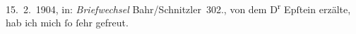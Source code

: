 \begin{ledgroupsized}[t]{13cm}
{{{                           15. 2. 1904, in: \emph{Briefwechsel}
                        Bahr/Schnitzler 302.}}}\label{K_L01392_2h}, von dem D\textsuperscript{r}{ }Epſtein erzälte, hab ich mich ſo ſehr
                  gefreut.\pend
           \endnumbering{}\end{ledgroupsized}  \newcommand{\dateiname}{L01392}\newcommand{\titel}{Hermann Bahr an Arthur Schnitzler, 23. 4. [1904]}\newcommand{\editorInnen}{ Kurt Ifkovits,  Martin Anton Müller}
            \footnotesize
\begin{ledgroupsized}[t]{11.5cm}
\end{ledgroupsized}
         
      